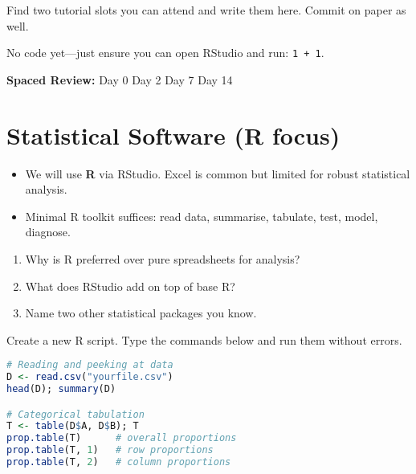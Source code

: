 \documentclass[11pt,a4paper]{article}
\newcommand{\reviewticks}{
  \vspace{0.4em}
  \noindent\scriptsize\textbf{Spaced Review:}
  \fbox{\phantom{D0}} Day 0\quad
  \fbox{\phantom{D2}} Day 2\quad
  \fbox{\phantom{D7}} Day 7\quad
  \fbox{\phantom{D14}} Day 14
}
\begin{document}
\begin{practicebox}
Find two tutorial slots you can attend and write them here. Commit on paper as well.
\end{practicebox}

\begin{rbox}
No code yet—just ensure you can open RStudio and run: \texttt{1 + 1}.
\end{rbox}

\reviewticks

\section{Statistical Software (R focus)}

\begin{corebox}
\begin{itemize}
  \item We will use \textbf{R} via RStudio. Excel is common but limited for robust statistical analysis.
  \item Minimal R toolkit suffices: read data, summarise, tabulate, test, model, diagnose.
\end{itemize}
\end{corebox}

\begin{recallbox}
\begin{enumerate}
  \item Why is R preferred over pure spreadsheets for analysis?
  \item What does RStudio add on top of base R?
  \item Name two other statistical packages you know.
\end{enumerate}
\end{recallbox}

\begin{practicebox}
Create a new R script. Type the commands below and run them without errors.
\end{practicebox}

\begin{rbox}
\begin{lstlisting}[language=R]
# Reading and peeking at data
D <- read.csv("yourfile.csv")
head(D); summary(D)

# Categorical tabulation
T <- table(D$A, D$B); T
prop.table(T)      # overall proportions
prop.table(T, 1)   # row proportions
prop.table(T, 2)   # column proportions
\end{lstlisting}
\end{rbox}
\end{document}
